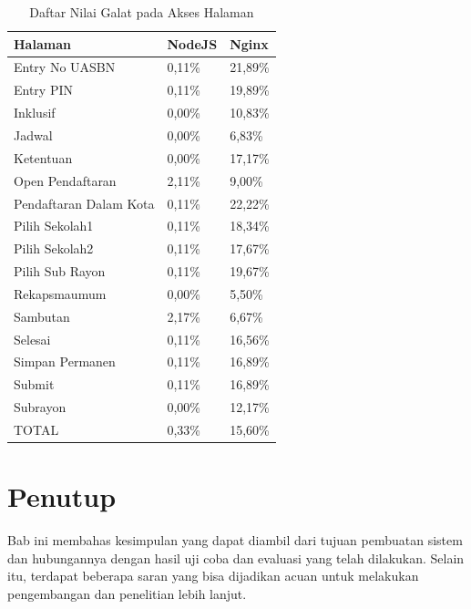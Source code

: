 \documentclass{ta-its}
\begin{document}
					\begin{longtable}{|p{}|p{0.2\textwidth}|p{}|} %
						
						\caption{Daftar Nilai Galat pada Akses Halaman} \label{tabelGalat} \\
						\hline
						\textbf{Halaman} & \textbf{NodeJS} & \textbf{Nginx} \\ \hline
						
						\endhead
						\endfoot
						\endlastfoot
						
						Entry No UASBN & 0,11\% & 21,89\% \\ \hline
						Entry PIN & 0,11\% & 19,89\% \\ \hline
						Inklusif & 0,00\% & 10,83\% \\ \hline
						Jadwal & 0,00\% & 6,83\% \\ \hline
						Ketentuan & 0,00\% & 17,17\% \\ \hline
						Open Pendaftaran & 2,11\% & 9,00\% \\ \hline
						Pendaftaran Dalam Kota & 0,11\% & 22,22\% \\ \hline
						Pilih Sekolah1 & 0,11\% & 18,34\% \\ \hline
						Pilih Sekolah2 & 0,11\% & 17,67\% \\ \hline
						Pilih Sub Rayon & 0,11\% & 19,67\% \\ \hline
						Rekapsmaumum & 0,00\% & 5,50\% \\ \hline
						Sambutan & 2,17\% & 6,67\% \\ \hline
						Selesai & 0,11\% & 16,56\% \\ \hline
						Simpan Permanen & 0,11\% & 16,89\% \\ \hline
						Submit & 0,11\% & 16,89\% \\ \hline
						Subrayon & 0,00\% & 12,17\% \\ \hline
						TOTAL & 0,33\% & 15,60\% \\ \hline
						
					\end{longtable}
					
		\chapter{Penutup}
			Bab ini membahas kesimpulan yang dapat diambil dari tujuan pembuatan sistem dan hubungannya dengan hasil uji coba dan evaluasi yang telah dilakukan. Selain itu, terdapat beberapa saran yang bisa dijadikan acuan untuk melakukan pengembangan dan penelitian lebih lanjut.
			
\end{document}
